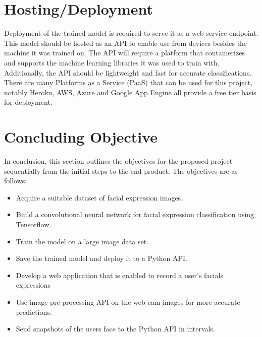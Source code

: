 \section{Hosting/Deployment}
Deployment of the trained model is required to serve it as a web service endpoint. This model should be hosted as an API to enable use from devices besides the machine it was trained on. The API will require a platform that containerizes and supports the machine learning libraries it was used to train with. Additionally, the API should be lightweight and fast for accurate classifications. There are many Platforms as a Service (PaaS) that can be used for this project, notably Heroku, AWS, Azure and Google App Engine all provide a free tier basis for deployment.


\section{Concluding Objective}
In conclusion, this section outlines the objectives for the proposed project sequentially from the initial steps to the end product. The objectives are as follows:

\begin{itemize}
	\item Acquire a suitable dataset of facial expression images.
	\item Build a convolutional neural network for facial expression classification using Tensorflow.
	\item Train the model on a large image data set.
	\item Save the trained model and deploy it to a Python API.
	\item Develop a web application that is enabled to record a user's facials expressions
	\item Use image pre-processing API on the web cam images for more accurate predictions.
	\item Send snapshots of the users face to the Python API in intervals.
\end{itemize}

